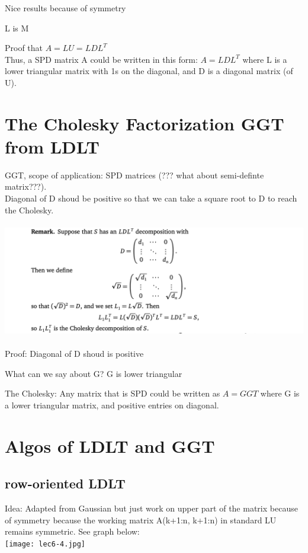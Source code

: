 \documentclass{article}
\begin{document}
\noindent
Nice results because of symmetry

L is M

\noindent
Proof that $A = LU = LDL^T$\\

\noindent
Thus, a SPD matrix A could be written in this form: $A = LDL^T$
where L is a lower triangular matrix with 1s on the diagonal, and D is a diagonal matrix (of U).\\



\pagebreak
\section{The Cholesky Factorization GGT from LDLT}

GGT, scope of application: SPD matrices (??? what about semi-definte matrix???).\\

Diagonal of D shoud be positive so that we can take a square root to D to reach the Cholesky.\\
\\
\includegraphics[width=1.5\linewidth]{lec6-3.png}\\
\\
\medskip
Proof: Diagonal of D shoud is positive


\noindent
What can we say about G? G is lower triangular

\noindent
The Cholesky: Any matrix that is SPD could be written as $A = GGT$ where G is a lower triangular matrix, and positive
entries on diagonal.\\

\pagebreak
\section{Algos of LDLT and GGT}
\subsection*{row-oriented LDLT}
Idea: Adapted from Gaussian but just work on upper part of the matrix because of symmetry because
the working matrix A(k+1:n, k+1:n) in standard LU remains symmetric. See graph below:\\
\texttt{[image: lec6-4.jpg]}\\
\end{document}
